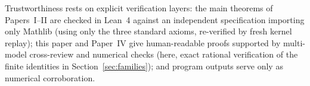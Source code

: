 \documentclass[11pt]{amsart}
\begin{document}
Trustworthiness rests on explicit verification layers: the main theorems of Papers~I--II are checked in Lean~4 against
an independent specification importing only Mathlib (using only the three standard axioms, re-verified by fresh kernel
replay); this paper and Paper~IV give human-readable proofs supported by multi-model cross-review and numerical checks
(here, exact rational verification of the finite identities in Section~\ref{sec:families}); and program outputs serve
only as numerical corroboration.



\end{document}
